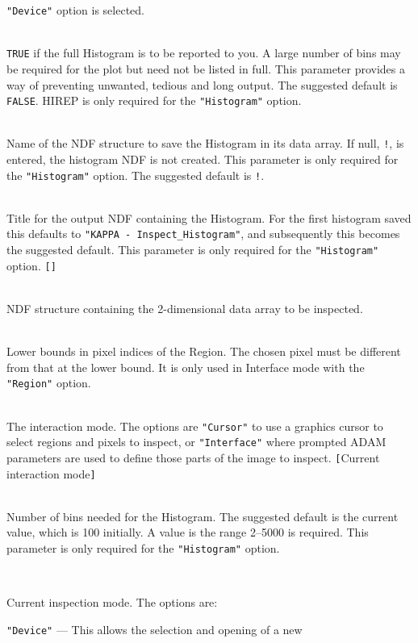 \documentclass[twoside,11pt]{article}
\newcommand{\sstsubsection}[1]{ \item[{#1}] \mbox{} \\}
\newcommand{\sstsubsection}[1]{\item[{#1}]}
\begin{document}
{{{         {\tt "Device"} option is selected.
      }
      \sstsubsection{
         HIREP = \_LOGICAL (Read)
      }{
         {\tt TRUE} if the full Histogram is to be reported to you.  A
         large number of bins may be required for the plot but need not
         be listed in full.  This parameter provides a way of preventing
         unwanted, tedious and long output.  The suggested default is
         {\tt FALSE}.  HIREP is only required for the {\tt "Histogram"} option.
      }
      \sstsubsection{
         HISTOGRAM = NDF (Read)
      }{
         Name of the NDF structure to save the Histogram in its data
         array.  If null, {\tt !}, is entered, the histogram NDF is not
         created.  This parameter is only required for the {\tt "Histogram"}
         option.  The suggested default is {\tt !}.
      }
      \sstsubsection{
         HITITLE = LITERAL (Read)
      }{
         Title for the output NDF containing the Histogram.  For the
         first histogram saved this defaults to
         {\tt "KAPPA - Inspect\_Histogram"}, and subsequently this becomes
         the suggested default.   This parameter is only required for
         the {\tt "Histogram"} option. {\tt []}
      }
      \sstsubsection{
         IN = NDF (Read)
      }{
         NDF structure containing the 2-dimensional data array to be inspected.
      }
      \sstsubsection{
         LBOUND( 2 ) = \_INTEGER (Read)
      }{
         Lower bounds in pixel indices of the Region.  The chosen pixel
         must be different from that at the lower bound.  It is only
         used in Interface mode with the {\tt "Region"} option.
      }
      \sstsubsection{
         MODE = LITERAL (Read)
      }{
         The interaction mode.  The options are {\tt "Cursor"} to use a
         graphics cursor to select regions and pixels to inspect,
         or {\tt "Interface"} where prompted ADAM parameters are used to
         define those parts of the image to inspect. {\tt [}Current
         interaction mode{\tt ]}
      }
      \sstsubsection{
         NUMBIN = \_INTEGER (Read)
      }{
         Number of bins needed for the Histogram.  The suggested default
         is the current value, which is 100 initially.  A value is the
         range 2--5000 is required.  This parameter is only required
         for the {\tt "Histogram"} option.
      }
      \sstsubsection{
         OPTION = LITERAL (Read)
      }{
         Current inspection mode.  The options are:
         \begin{description}
         \item {\tt "Device"} --- This allows the selection and opening of a new

\end{description}}}}
\end{document}
